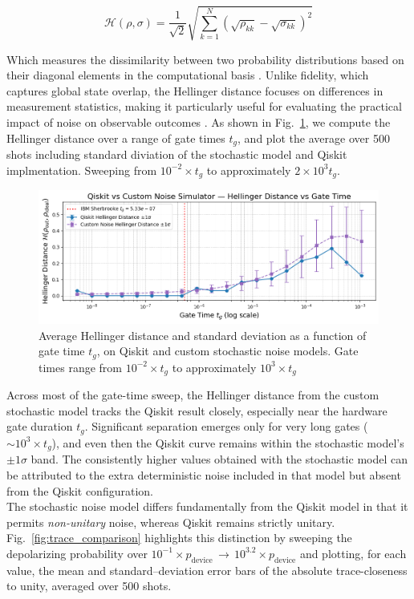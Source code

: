 \documentclass[9pt,a4paper,twocolumn,twoside]{tau-class/tau}
\begin{document}
\begin{equation}
\mathcal{H}(\rho, \sigma) = \dfrac{1}{\sqrt{2}} \sqrt{\sum_{k=1}^N \left( \sqrt{\rho_{kk}} - \sqrt{\sigma_{kk}} \right)^2}
\end{equation}

Which measures the dissimilarity between two probability distributions based on their diagonal elements in the computational basis \cite{dibartolomeo2023noisy}. Unlike fidelity, which captures global state overlap, the Hellinger distance focuses on differences in measurement statistics, making it particularly useful for evaluating the practical impact of noise on observable outcomes \cite{dibartolomeo2023noisy}. As shown in Fig.~\ref{fig:hellinger_comparison}, we compute the Hellinger distance over a range of gate times \( t_g \), and plot the average over 500 shots including standard diviation of the stochastic model and Qiskit implmentation. Sweeping from \( 10^{-2} \times t_g \) to approximately \( 2 \times 10^3 t_g \).

\begin{figure}[H]
    \centering
        \includegraphics[width=1\linewidth]{figures/Hellinger_compare.png}
    \caption{Average Hellinger distance and standard deviation as a function of gate time \( t_g \), on Qiskit and custom stochastic noise models. Gate times range from \( 10^{-2} \times t_g \) to approximately \( 10^{3} \times t_g \)}
    \label{fig:hellinger_comparison}
\end{figure}

Across most of the gate-time sweep, the Hellinger distance from the custom stochastic model tracks the Qiskit result closely, especially near the hardware gate duration \( t_g \). Significant separation emerges only for very long gates (\( \sim 10^{3}\times t_g \)), and even then the Qiskit curve remains within the stochastic model’s \( \pm 1\sigma \) band. The consistently higher values obtained with the stochastic model can be attributed to the extra deterministic  noise included in that model but absent from the Qiskit configuration.\\
The stochastic noise model differs fundamentally from the Qiskit model in that it permits \emph{non-unitary} noise, whereas Qiskit remains strictly unitary.  
Fig.~\ref{fig:trace_comparison} highlights this distinction by sweeping the depolarizing probability over \(10^{-1}\times p_{\text{device}} \,\rightarrow\, 10^{3.2} \times p_{\text{device}}\) and plotting, for each value, the mean and standard–deviation error bars of the absolute trace-closeness to unity, averaged over 500 shots.
\end{document}
